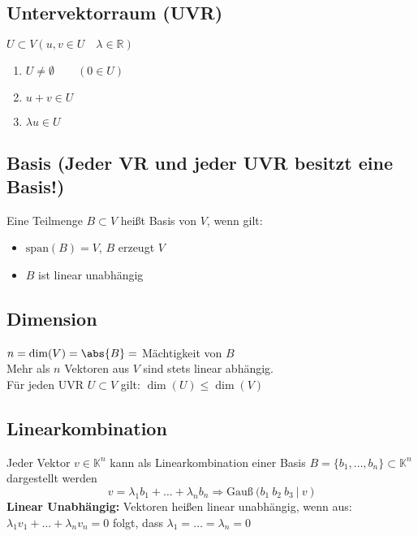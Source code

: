\documentclass[german, 6pt]{latex4ei/latex4ei_sheet}
\begin{document}
\subsection{Untervektorraum (UVR)}
$U\subset V (u,v\in U \quad \lambda\in\mathbb{R})$
\begin{enumerate}\itemsep0pt
\item $U\ne \emptyset \qquad (0\in U)$
\item $u+v\in U$
\item $\lambda u \in U$
\end{enumerate}

\subsection{Basis (Jeder VR und jeder UVR besitzt eine Basis!)} %
\label{sub:basis}
 Eine Teilmenge $B\subset V$ heißt Basis von $V$, wenn gilt:
\begin{itemize}\itemsep0pt
	\item $\mathrm{span}(B) =V$, $B$ erzeugt $V$
	\item $B$ ist linear unabhängig
\end{itemize}    

\subsection{Dimension}
$n=\dim(V)=\abs{B} = $ Mächtigkeit von $B$\\
Mehr als $n$ Vektoren aus $V$ sind stets linear abhängig. \\
Für jeden UVR $U \subset V$ gilt: $\dim (U) \le \dim (V)$ 

\subsection{Linearkombination}
Jeder Vektor $v\in\mathbb{K}^n$ kann als Linearkombination einer Basis $B=\{b_1, \dots, b_n\} \subset \mathbb{K}^n$ dargestellt werden
\begin{equation*}
v=\lambda_1 b_1 + \dots + \lambda_n b_n \Rightarrow \text{Gauß} \ \Big(b_1 \ b_2 \ b_3 \ |\ v\ \Big)
\end{equation*}
\textbf{Linear Unabhängig:}
Vektoren heißen linear unabhängig, wenn aus: \\
$\lambda_1 v_1 + \dots + \lambda_n v_n = 0$ folgt, dass $\lambda_1 = \dots = \lambda_n = 0$
\end{document}
